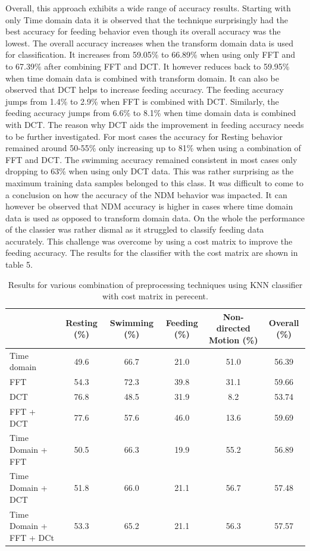 \documentclass[conference]{IEEEtran}
\begin{document}
Overall, this approach exhibits a wide range of accuracy results. Starting with only Time domain data it is observed that the technique surprisingly had the best accuracy for feeding behavior even though its overall accuracy was the lowest. The overall accuracy increases when the transform domain data is used for classification. It increases from 59.05\% to 66.89\% when using only FFT and to 67.39\% after combining FFT and DCT. It however reduces back to 59.95\% when time domain data is combined with transform domain. It can also be observed that DCT helps to increase feeding accuracy. The feeding accuracy jumps from 1.4\% to 2.9\% when FFT is combined with DCT. Similarly, the feeding accuracy jumps from 6.6\% to 8.1\% when time domain data is combined with DCT. The reason why DCT aids the improvement in feeding accuracy needs to be further investigated. For most cases the accuracy for Resting behavior remained around 50-55\% only increasing up to 81\% when using a combination of FFT and DCT. The swimming accuracy remained consistent in most cases only dropping to 63\% when using only DCT data. This was rather surprising as the maximum training data samples belonged to this class. It was difficult to come to a conclusion on how the accuracy of the NDM behavior was impacted. It can however be observed that NDM accuracy is higher in cases where time domain data is used as opposed to transform domain data. On the whole the performance of the classier was rather dismal as it struggled to classify feeding data accurately. This challenge was overcome by using a cost matrix to improve the feeding accuracy. The results for the classifier with the cost matrix are shown in table 5.

\begin{table}[h]
	\centering
	\caption{Results for various combination of preprocessing techniques using KNN classifier with cost matrix in perecent.}
	\begin{tabular}{l c c c c c}
	\hline
	& \textbf{Resting} (\%) & \textbf{Swimming}  (\%) & \textbf{Feeding}  (\%) & \textbf{Non-directed Motion}  (\%) & \textbf{Overall}  (\%) \\
	\hline
	Time domain & 49.6	&66.7&	21.0&	51.0&	56.39\\
     FFT & 54.3&	72.3&	39.8&	31.1&	59.66\\
     DCT & 76.8&	48.5&	31.9&	8.2&	53.74\\
   FFT + DCT & 77.6&	57.6&	46.0&	13.6&	59.69\\
	Time Domain + FFT & 50.5&	66.3&	19.9&	55.2&	56.89\\
	Time Domain + DCT & 51.8&	66.0&	21.1&	56.7&	57.48\\
	Time Domain + FFT + DCt & 53.3&	65.2&	21.1&	56.3&	57.57\\
	\hline
	\end{tabular}
	\label{without cost matrix}
\end{table}
\end{document}
